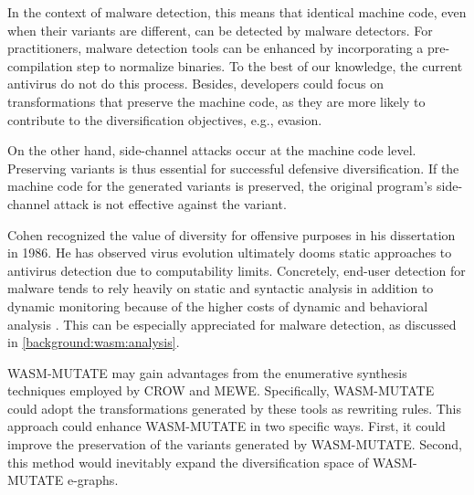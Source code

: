 In the context of \Wasm malware detection, this means that identical machine code, even when their \Wasm variants are different, can be detected by malware detectors.
For practitioners, malware detection tools can be enhanced by incorporating a pre-compilation step to normalize \Wasm binaries.
To the best of our knowledge, the current antivirus do not do this process.
Besides, developers could focus on transformations that preserve the machine code, as they are more likely to contribute to the diversification objectives, e.g., evasion.

On the other hand, side-channel attacks occur at the machine code level. 
Preserving \Wasm variants is thus essential for successful defensive diversification. 
If the machine code for the generated variants is preserved, the original \Wasm program's side-channel attack is not effective against the variant.




    
Cohen \cite{} recognized the value of diversity for offensive purposes in his dissertation in 1986. 
He has observed virus evolution ultimately dooms static approaches to antivirus detection due to computability limits.
Concretely, end-user detection for malware tends to rely heavily on static and syntactic analysis in addition to dynamic monitoring because of the higher costs of dynamic and behavioral analysis \cite{offensive_div}.
This can be especially appreciated for \Wasm malware detection, as discussed in \autoref{background:wasm:analysis}.


\begin{strategy}
    WASM-MUTATE may gain advantages from the enumerative synthesis techniques employed by CROW and MEWE. 
    Specifically, WASM-MUTATE could adopt the transformations generated by these tools as rewriting rules. 
    This approach could enhance WASM-MUTATE in two specific ways. 
    First, it could improve the preservation of the variants generated by WASM-MUTATE. 
    Second, this method would inevitably expand the diversification space of WASM-MUTATE e-graphs.
    \end{strategy}
    




